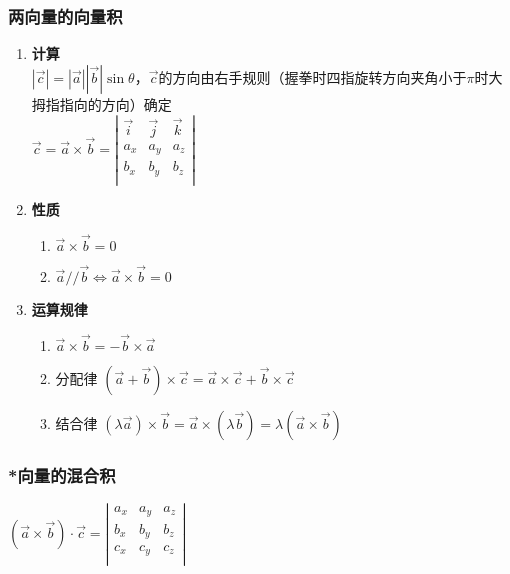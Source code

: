 \documentclass{article} %
\begin{document}
\subsubsection{两向量的向量积}
\begin{enumerate}
    \item \textbf{计算}\\
    $|\overrightarrow{c}|=|\overrightarrow{a}||\overrightarrow{b}|\sin\theta$，$\overrightarrow{c}$的方向由右手规则（握拳时四指旋转方向夹角小于$\pi$时大拇指指向的方向）确定\\
    $\overrightarrow{c}=\overrightarrow{a}\times \overrightarrow{b}
    =\left|
        \begin{array}{ccc}
            \overrightarrow{i} & \overrightarrow{j} & \overrightarrow{k} \\
            a_x & a_y & a_z \\
            b_x & b_y & b_z \\
        \end{array}
    \right|
    $\\

    \item \textbf{性质}\begin{enumerate}
        \item $\overrightarrow{a}\times\overrightarrow{b}=0$
        \item $\overrightarrow{a}// \overrightarrow{b}\Leftrightarrow\overrightarrow{a}\times\overrightarrow{b}=0$
    \end{enumerate}

    \item \textbf{运算规律}\begin{enumerate}
        \item $\overrightarrow{a}\times\overrightarrow{b}=-\overrightarrow{b}\times\overrightarrow{a}$
        \item 分配律 $(\overrightarrow{a}+\overrightarrow{b})\times\overrightarrow{c}=\overrightarrow{a}\times\overrightarrow{c}+\overrightarrow{b}\times\overrightarrow{c}$
        \item 结合律 $(\lambda\overrightarrow{a})\times\overrightarrow{b}=\overrightarrow{a}\times(\lambda\overrightarrow{b})=\lambda(\overrightarrow{a}\times\overrightarrow{b})$
    \end{enumerate}

\end{enumerate}
\subsubsection{*向量的混合积}
$(\overrightarrow{a}\times\overrightarrow{b})\cdot\overrightarrow{c}=
\left|\begin{array}{ccc}
    a_x & a_y & a_z \\
    b_x & b_y & b_z \\
    c_x & c_y & c_z \\
\end{array}\right|
$
\end{document}
